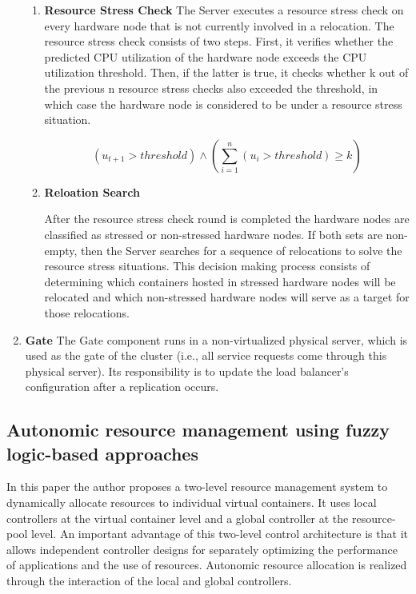 \documentclass[conference]{IEEEtran}
\begin{document}
\begin{enumerate}
\begin{enumerate}
\item{\textbf{Resource Stress Check}} The Server executes a resource stress check on every hardware node that is not currently involved in a relocation. 
The resource stress check consists of two steps. First, it verifies whether the predicted CPU utilization of the hardware node exceeds the CPU utilization threshold. Then, if the latter is true, it checks whether k out of the previous n resource stress checks also exceeded the threshold, in which case the hardware node is considered to be under a resource stress situation.

$$(u_{t+1} > threshold) \land (\sum_{i=1}^{n}(u_i > threshold)\geq k)$$
\item{\textbf{Reloation Search}} 


 After the resource stress check round is completed the hardware nodes are classified as stressed or non-stressed hardware nodes. If both sets are non-empty, then the Server searches for a sequence of relocations to solve the resource stress situations. This decision making process consists of determining which containers hosted in stressed hardware nodes will be relocated and which non-stressed hardware nodes will serve as a target for those relocations.

\end{enumerate}


\item{\textbf{Gate}} The Gate component runs in a non-virtualized physical server, which is used as the gate of the cluster (i.e., all service requests come through this physical server). Its responsibility is to update the load balancer’s configuration after a replication occurs.
\end{enumerate}


\subsection{Autonomic resource management using
fuzzy logic-based approaches}

In this paper the author proposes a two-level resource management
system to dynamically allocate resources to individual
virtual containers. It uses local controllers at the virtual container
level and a global controller at the resource-pool
level. An important advantage of this two-level control architecture
is that it allows independent controller designs for
separately optimizing the performance of applications and
the use of resources. Autonomic resource allocation is realized
through the interaction of the local and global controllers.
\end{document}
